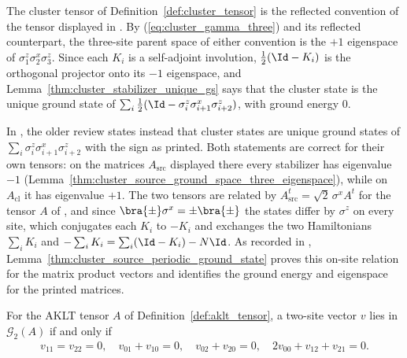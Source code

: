 \begin{remark}\label{rem:cluster_stabilizer_convention}
    The cluster tensor of Definition~\ref{def:cluster_tensor} is the reflected
    convention of the tensor displayed in
    \cite[lines~2364--2369]{Cirac2021Matrix}. By (\ref{eq:cluster_gamma_three})
    and its reflected counterpart, the three-site parent space of either
    convention is the $+1$ eigenspace of $\sigma^z_1\sigma^x_2\sigma^z_3$.
    Since each $K_i$ is a self-adjoint involution, $\tfrac12(\Id-K_i)$ is the
    orthogonal projector onto its $-1$ eigenspace, and
    Lemma~\ref{thm:cluster_stabilizer_unique_gs} says that the cluster state
    is the unique ground state of
    $\sum_i \tfrac12(\Id - \sigma^z_i\sigma^x_{i+1}\sigma^z_{i+2})$, with
    ground energy $0$.

    In \cite[local TeX lines~374--387]{PerezGarcia2007Matrix}, the older
    review states instead that cluster states are unique ground states of
    $\sum_i \sigma^z_i\sigma^x_{i+1}\sigma^z_{i+2}$ with the sign as printed.
    Both statements are correct for their own tensors: on the matrices
    $A_{\mathrm{src}}$ displayed there every stabilizer has eigenvalue $-1$
    (Lemma~\ref{thm:cluster_source_ground_space_three_eigenspace}), while on
    $A_{\mathrm{cl}}$ it has eigenvalue $+1$. The two tensors are related by
    $A_{\mathrm{src}}^t = \sqrt2\,\sigma^x A^t$ for the tensor $A$ of
    \cite[lines~2364--2369]{Cirac2021Matrix}, and since
    $\bra{\pm}\sigma^x = \pm\bra{\pm}$ the states differ by $\sigma^z$ on
    every site, which conjugates each $K_i$ to $-K_i$ and exchanges the two
    Hamiltonians $\sum_i K_i$ and $-\sum_i K_i = \sum_i(\Id-K_i) - N\Id$.
    As recorded in \cite{gap:rmp_example_parent_hamiltonian_scope},
    Lemma~\ref{thm:cluster_source_periodic_ground_state} proves this on-site
    relation for the matrix product vectors and identifies the ground energy
    and eigenspace for the printed matrices.
\end{remark}

\begin{lemma}\label{thm:aklt_ground_space_two}
    \leanok
    For the AKLT tensor $A$ of Definition~\ref{def:aklt_tensor}, a two-site
    vector $v$ lies in $\mathcal G_2(A)$ if and only if
    \begin{align}
        v_{11} = v_{22} = 0,
        \quad
        v_{01} + v_{10} = 0,
        \quad
        v_{02} + v_{20} = 0,
        \quad
        2v_{00} + v_{12} + v_{21} = 0.
        \label{eq:aklt_two_site_constraints}
    \end{align}
\end{lemma}

